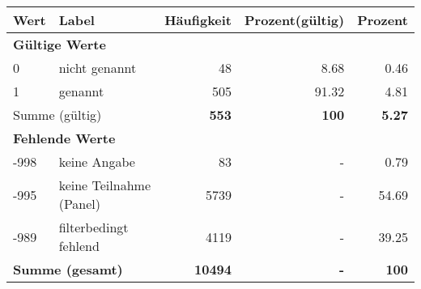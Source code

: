      \begin{longtable}{lXrrr}
     \toprule
     \textbf{Wert} & \textbf{Label} & \textbf{Häufigkeit} & \textbf{Prozent(gültig)} & \textbf{Prozent} \\
     \endhead
     \midrule
     \multicolumn{5}{l}{\textbf{Gültige Werte}}\\

     0 &
     \multicolumn{1}{X}{ nicht genannt   } &


       \num{48} &
       \num[round-mode=places,round-precision=2]{8.68} &
         \num[round-mode=places,round-precision=2]{0.46} \\

     1 &
     \multicolumn{1}{X}{ genannt   } &


       \num{505} &
       \num[round-mode=places,round-precision=2]{91.32} &
         \num[round-mode=places,round-precision=2]{4.81} \\
     \midrule
     \multicolumn{2}{l}{Summe (gültig)} &
       \textbf{\num{553}} &
     \textbf{\num{100}} &
       \textbf{\num[round-mode=places,round-precision=2]{5.27}} \\
     \multicolumn{5}{l}{\textbf{Fehlende Werte}}\\
       -998 &
       keine Angabe &
         \num{83} &
        - &
         \num[round-mode=places,round-precision=2]{0.79} \\
       -995 &
       keine Teilnahme (Panel) &
         \num{5739} &
        - &
         \num[round-mode=places,round-precision=2]{54.69} \\
       -989 &
       filterbedingt fehlend &
         \num{4119} &
        - &
         \num[round-mode=places,round-precision=2]{39.25} \\
     \midrule
     \multicolumn{2}{l}{\textbf{Summe (gesamt)}} &
          \textbf{\num{10494}} &
        \textbf{-} &
        \textbf{\num{100}} \\
     \bottomrule
     \end{longtable}
     
